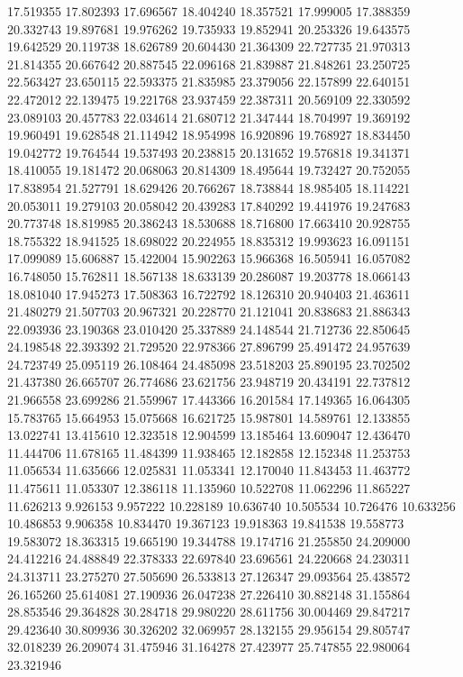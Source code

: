 17.519355
17.802393
17.696567
18.404240
18.357521
17.999005
17.388359
20.332743
19.897681
19.976262
19.735933
19.852941
20.253326
19.643575
19.642529
20.119738
18.626789
20.604430
21.364309
22.727735
21.970313
21.814355
20.667642
20.887545
22.096168
21.839887
21.848261
23.250725
22.563427
23.650115
22.593375
21.835985
23.379056
22.157899
22.640151
22.472012
22.139475
19.221768
23.937459
22.387311
20.569109
22.330592
23.089103
20.457783
22.034614
21.680712
21.347444
18.704997
19.369192
19.960491
19.628548
21.114942
18.954998
16.920896
19.768927
18.834450
19.042772
19.764544
19.537493
20.238815
20.131652
19.576818
19.341371
18.410055
19.181472
20.068063
20.814309
18.495644
19.732427
20.752055
17.838954
21.527791
18.629426
20.766267
18.738844
18.985405
18.114221
20.053011
19.279103
20.058042
20.439283
17.840292
19.441976
19.247683
20.773748
18.819985
20.386243
18.530688
18.716800
17.663410
20.928755
18.755322
18.941525
18.698022
20.224955
18.835312
19.993623
16.091151
17.099089
15.606887
15.422004
15.902263
15.966368
16.505941
16.057082
16.748050
15.762811
18.567138
18.633139
20.286087
19.203778
18.066143
18.081040
17.945273
17.508363
16.722792
18.126310
20.940403
21.463611
21.480279
21.507703
20.967321
20.228770
21.121041
20.838683
21.886343
22.093936
23.190368
23.010420
25.337889
24.148544
21.712736
22.850645
24.198548
22.393392
21.729520
22.978366
27.896799
25.491472
24.957639
24.723749
25.095119
26.108464
24.485098
23.518203
25.890195
23.702502
21.437380
26.665707
26.774686
23.621756
23.948719
20.434191
22.737812
21.966558
23.699286
21.559967
17.443366
16.201584
17.149365
16.064305
15.783765
15.664953
15.075668
16.621725
15.987801
14.589761
12.133855
13.022741
13.415610
12.323518
12.904599
13.185464
13.609047
12.436470
11.444706
11.678165
11.484399
11.938465
12.182858
12.152348
11.253753
11.056534
11.635666
12.025831
11.053341
12.170040
11.843453
11.463772
11.475611
11.053307
12.386118
11.135960
10.522708
11.062296
11.865227
11.626213
9.926153
9.957222
10.228189
10.636740
10.505534
10.726476
10.633256
10.486853
9.906358
10.834470
19.367123
19.918363
19.841538
19.558773
19.583072
18.363315
19.665190
19.344788
19.174716
21.255850
24.209000
24.412216
24.488849
22.378333
22.697840
23.696561
24.220668
24.230311
24.313711
23.275270
27.505690
26.533813
27.126347
29.093564
25.438572
26.165260
25.614081
27.190936
26.047238
27.226410
30.882148
31.155864
28.853546
29.364828
30.284718
29.980220
28.611756
30.004469
29.847217
29.423640
30.809936
30.326202
32.069957
28.132155
29.956154
29.805747
32.018239
26.209074
31.475946
31.164278
27.423977
25.747855
22.980064
23.321946
